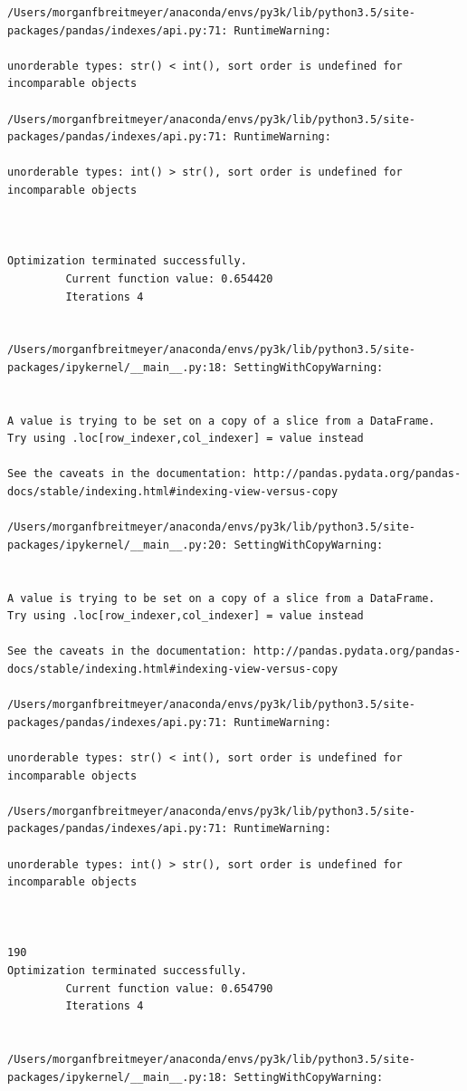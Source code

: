 \begin{lstlisting}
/Users/morganfbreitmeyer/anaconda/envs/py3k/lib/python3.5/site-packages/pandas/indexes/api.py:71: RuntimeWarning:

unorderable types: str() < int(), sort order is undefined for incomparable objects

/Users/morganfbreitmeyer/anaconda/envs/py3k/lib/python3.5/site-packages/pandas/indexes/api.py:71: RuntimeWarning:

unorderable types: int() > str(), sort order is undefined for incomparable objects



Optimization terminated successfully.
         Current function value: 0.654420
         Iterations 4


/Users/morganfbreitmeyer/anaconda/envs/py3k/lib/python3.5/site-packages/ipykernel/__main__.py:18: SettingWithCopyWarning:


A value is trying to be set on a copy of a slice from a DataFrame.
Try using .loc[row_indexer,col_indexer] = value instead

See the caveats in the documentation: http://pandas.pydata.org/pandas-docs/stable/indexing.html#indexing-view-versus-copy

/Users/morganfbreitmeyer/anaconda/envs/py3k/lib/python3.5/site-packages/ipykernel/__main__.py:20: SettingWithCopyWarning:


A value is trying to be set on a copy of a slice from a DataFrame.
Try using .loc[row_indexer,col_indexer] = value instead

See the caveats in the documentation: http://pandas.pydata.org/pandas-docs/stable/indexing.html#indexing-view-versus-copy

/Users/morganfbreitmeyer/anaconda/envs/py3k/lib/python3.5/site-packages/pandas/indexes/api.py:71: RuntimeWarning:

unorderable types: str() < int(), sort order is undefined for incomparable objects

/Users/morganfbreitmeyer/anaconda/envs/py3k/lib/python3.5/site-packages/pandas/indexes/api.py:71: RuntimeWarning:

unorderable types: int() > str(), sort order is undefined for incomparable objects



190
Optimization terminated successfully.
         Current function value: 0.654790
         Iterations 4


/Users/morganfbreitmeyer/anaconda/envs/py3k/lib/python3.5/site-packages/ipykernel/__main__.py:18: SettingWithCopyWarning:



\end{lstlisting}

